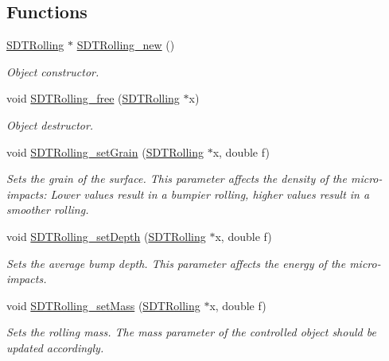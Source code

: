 \subsection*{Functions}
\begin{DoxyCompactItemize}
\item 
\hyperlink{group__rolling_ga0a20b598aea5fdc9789aa77fdb4852b1}{S\+D\+T\+Rolling} $\ast$ \hyperlink{group__rolling_ga8a04949ff0e9034761cb3ed0634c7014}{S\+D\+T\+Rolling\+\_\+new} ()
\begin{DoxyCompactList}\small\item\em Object constructor. \end{DoxyCompactList}\item 
void \hyperlink{group__rolling_ga4b159394b13ddd09edeaceaa17f98982}{S\+D\+T\+Rolling\+\_\+free} (\hyperlink{group__rolling_ga0a20b598aea5fdc9789aa77fdb4852b1}{S\+D\+T\+Rolling} $\ast$x)
\begin{DoxyCompactList}\small\item\em Object destructor. \end{DoxyCompactList}\item 
void \hyperlink{group__rolling_ga7550d2bef269842332c90282c7da22e5}{S\+D\+T\+Rolling\+\_\+set\+Grain} (\hyperlink{group__rolling_ga0a20b598aea5fdc9789aa77fdb4852b1}{S\+D\+T\+Rolling} $\ast$x, double f)
\begin{DoxyCompactList}\small\item\em Sets the grain of the surface. This parameter affects the density of the micro-\/impacts\+: Lower values result in a bumpier rolling, higher values result in a smoother rolling. \end{DoxyCompactList}\item 
void \hyperlink{group__rolling_gabcca17d6ff4bbc44e25e8d6a3a7b3ce4}{S\+D\+T\+Rolling\+\_\+set\+Depth} (\hyperlink{group__rolling_ga0a20b598aea5fdc9789aa77fdb4852b1}{S\+D\+T\+Rolling} $\ast$x, double f)
\begin{DoxyCompactList}\small\item\em Sets the average bump depth. This parameter affects the energy of the micro-\/impacts. \end{DoxyCompactList}\item 
void \hyperlink{group__rolling_ga7678110b0e5f86877bf05d51cef1bfcb}{S\+D\+T\+Rolling\+\_\+set\+Mass} (\hyperlink{group__rolling_ga0a20b598aea5fdc9789aa77fdb4852b1}{S\+D\+T\+Rolling} $\ast$x, double f)
\begin{DoxyCompactList}\small\item\em Sets the rolling mass. The mass parameter of the controlled object should be updated accordingly. \end{DoxyCompactList}\item 

\end{DoxyCompactItemize}
